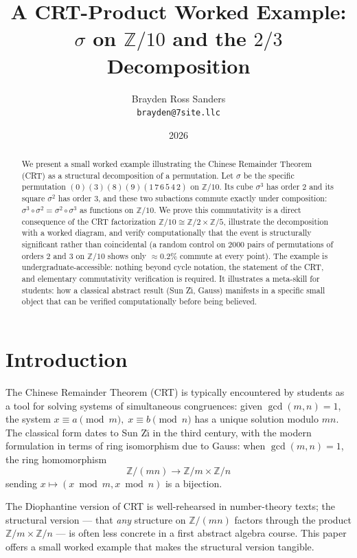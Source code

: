 \documentclass[11pt]{article}
\title{A CRT-Product Worked Example: \\ $\sigma$ on $\mathbb{Z}/10$ and the $2/3$ Decomposition}
\author{Brayden Ross Sanders \\ \texttt{brayden@7site.llc}}
\date{2026}
\theoremstyle{plain}
\theoremstyle{definition}
\theoremstyle{remark}
\begin{document}
\maketitle

\begin{abstract}
We present a small worked example illustrating the Chinese Remainder Theorem (CRT) as a structural decomposition of a permutation. Let $\sigma$ be the specific permutation $(0)(3)(8)(9)(1\,7\,6\,5\,4\,2)$ on $\mathbb{Z}/10$. Its cube $\sigma^3$ has order $2$ and its square $\sigma^2$ has order $3$, and these two subactions commute exactly under composition: $\sigma^3 \circ \sigma^2 = \sigma^2 \circ \sigma^3$ as functions on $\mathbb{Z}/10$. We prove this commutativity is a direct consequence of the CRT factorization $\mathbb{Z}/10 \cong \mathbb{Z}/2 \times \mathbb{Z}/5$, illustrate the decomposition with a worked diagram, and verify computationally that the event is structurally significant rather than coincidental (a random control on $2000$ pairs of permutations of orders $2$ and $3$ on $\mathbb{Z}/10$ shows only $\approx 0.2\%$ commute at every point). The example is undergraduate-accessible: nothing beyond cycle notation, the statement of the CRT, and elementary commutativity verification is required. It illustrates a meta-skill for students: how a classical abstract result (Sun Z\u{\i}, Gauss) manifests in a specific small object that can be verified computationally before being believed.
\end{abstract}

\section{Introduction}

The Chinese Remainder Theorem (CRT) is typically encountered by students as a tool for solving systems of simultaneous congruences: given $\gcd(m, n) = 1$, the system $x \equiv a \pmod{m}, \; x \equiv b \pmod{n}$ has a unique solution modulo $mn$. The classical form dates to Sun Z\u{\i} in the third century, with the modern formulation in terms of ring isomorphism due to Gauss: when $\gcd(m, n) = 1$, the ring homomorphism
\begin{equation}
\mathbb{Z}/(mn) \to \mathbb{Z}/m \times \mathbb{Z}/n
\label{eq:crt}
\end{equation}
sending $x \mapsto (x \bmod m, x \bmod n)$ is a bijection.

The Diophantine version of CRT is well-rehearsed in number-theory texts; the structural version --- that \emph{any} structure on $\mathbb{Z}/(mn)$ factors through the product $\mathbb{Z}/m \times \mathbb{Z}/n$ --- is often less concrete in a first abstract algebra course. This paper offers a small worked example that makes the structural version tangible.
\end{document}
